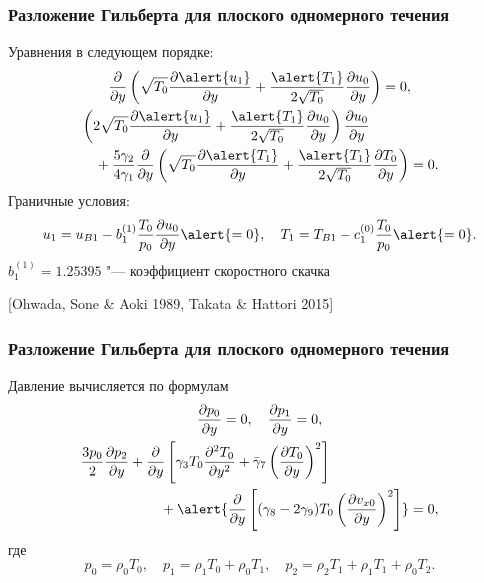 \documentclass[mathserif]{beamer} %
\newcommand{\pder}[2][]{\frac{\partial#1}{\partial#2}}
\newcommand{\pderdual}[2][]{\frac{\partial^2#1}{\partial#2^2}}
\begin{document}
\begin{frame}
    \frametitle{Разложение Гильберта для плоского одномерного течения}
    Уравнения в следующем порядке:
    \begin{gather}
        \pder{y}\left( \sqrt{T_0}\pder[\alert{u_1}]{y} + \frac{\alert{T_1}}{2\sqrt{T_0}}\pder[u_0]{y} \right) = 0, \\
        \begin{multlined}[][9cm]
        \left( 2\sqrt{T_0}\pder[\alert{u_1}]{y} + \frac{\alert{T_1}}{2\sqrt{T_0}}\pder[u_0]{y} \right) \pder[u_0]{y} \\
            + \frac{5\gamma_2}{4\gamma_1} \pder{y}\left( \sqrt{T_0}\pder[\alert{T_1}]{y}
            + \frac{\alert{T_1}}{2\sqrt{T_0}}\pder[T_0]{y} \right) = 0.
        \end{multlined}
    \end{gather}
    Граничные условия:
    \begin{equation}
        u_1 = u_{B1} - b_1^{(1)} \frac{T_0}{p_0} \pder[u_0]{y} \alert{=0}, \quad
        T_1 = T_{B1} - c_1^{(0)} \frac{T_0}{p_0} \alert{=0}.
    \end{equation}
    \(b_1^{(1)} = 1.25395\) "--- коэффициент скоростного скачка

    [Ohwada, Sone \& Aoki 1989, Takata \& Hattori 2015]
\end{frame}

\begin{frame}
    \frametitle{Разложение Гильберта для плоского одномерного течения}
    Давление вычисляется по формулам
    \begin{gather}
        \pder[p_0]{y} = 0, \quad \pder[p_1]{y} = 0, \label{eq:hilbert_p0_p1} \\
        \begin{multlined}[][9cm]
        \frac{3p_0}{2}\pder[p_2]{y}
            + \pder{y}\left[ \gamma_3 T_0 \pderdual[T_0]{y} + \bar{\gamma}_7\left(\pder[T_0]{y}\right)^2 \right] \\
            + \alert{\pder{y}\left[ (\gamma_8-2\gamma_9)T_0\left(\pder[v_{x0}]{y}\right)^2 \right]} = 0, \label{eq:hilbert_p2}
        \end{multlined}
    \end{gather}
    где
    \begin{equation}\label{eq:hilbert_expansion_p}
        p_0 = \rho_0 T_0, \quad
        p_1 = \rho_1 T_0 + \rho_0 T_1, \quad
        p_2 = \rho_2 T_1 + \rho_1 T_1 + \rho_0 T_2.
    \end{equation}
\end{frame}
\end{document}
